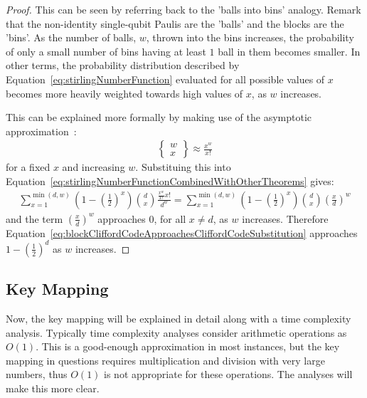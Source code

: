 \begin{proof}
This can be seen by referring back to the 'balls into bins' analogy. Remark that the non-identity single-qubit Paulis are the 'balls' and the blocks are the 'bins'. As the number of balls, $w$, thrown into the bins increases, the probability of only a small number of bins having at least $1$ ball in them becomes smaller. In other terms, the probability distribution described by Equation~\eqref{eq:stirlingNumberFunction} evaluated for all possible values of $x$ becomes more heavily weighted towards high values of $x$, as $w$ increases.

This can be explained more formally by making use of the asymptotic approximation~\cite{stirlingSecondKindApproximation}:
\begin{align}
\left\{\begin{smallmatrix}w\\x\end{smallmatrix}\right\} \approx \frac{x^w}{x!}
\end{align}
for a fixed $x$ and increasing $w$. Substituing this into Equation~\eqref{eq:stirlingNumberFunctionCombinedWithOtherTheorems} gives:
\begin{align}
\sum_{x=1} ^{\min(d,w)} \left(1-\left(\frac{1}{2}\right)^{x}\right) {d \choose x} \frac{\frac{x^w}{x!}x!}{d^w} = \sum_{x=1} ^{\min(d,w)} \left(1-\left(\frac{1}{2}\right)^{x}\right) {d \choose x} \left(\frac{x}{d}\right)^w \label{eq:blockCliffordCodeApproachesCliffordCodeSubstitution}
\end{align}
and the term $\left(\frac{x}{d}\right)^w$ approaches $0$, for all $x \neq d$, as $w$ increases. Therefore Equation~\eqref{eq:blockCliffordCodeApproachesCliffordCodeSubstitution} approaches $1 - \left(\frac{1}{2}\right)^d$ as $w$ increases.
\end{proof}

\subsection{Key Mapping}
\label{subsubsection:keyMappings}
Now, the key mapping will be explained in detail along with a time complexity analysis. Typically time complexity analyses consider arithmetic operations as $O\left(1\right)$. This is a good-enough approximation in most instances, but the key mapping in questions requires multiplication and division with very large numbers, thus $O\left(1\right)$ is not appropriate for these operations. The analyses will make this more clear. 

